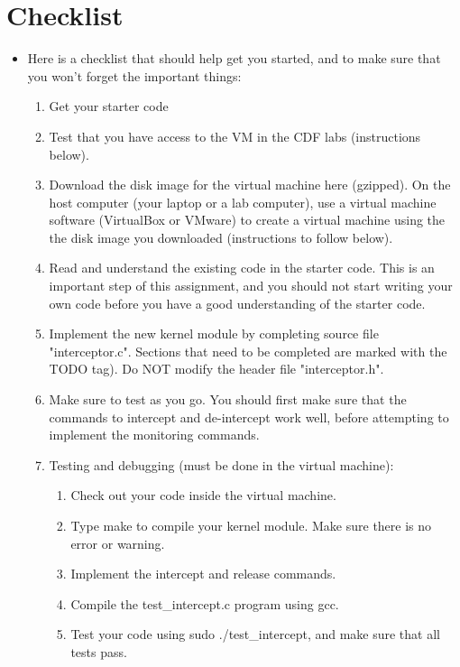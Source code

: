 \documentclass[12pt]{article}
\begin{document}
\section{Checklist}

\begin{itemize}
    \item

    Here is a checklist that should help get you started, and to make sure that you won't forget the important things:

    \begin{enumerate}[1.]
        \item Get your starter code
        \item Test that you have access to the VM in the CDF labs (instructions below).
        \item Download the disk image for the virtual machine here (gzipped).
              On the host computer (your laptop or a lab computer), use a virtual machine software (VirtualBox or VMware) to create a virtual machine using the the disk image you downloaded (instructions to follow below).
        \item Read and understand the existing code in the starter code. This is an important step of this assignment, and you should not start writing your own code before you have a good understanding of the starter code.
        \item Implement the new kernel module by completing source file "interceptor.c". Sections that need to be completed are marked with the TODO tag). Do NOT modify the header file "interceptor.h".
        \item Make sure to test as you go. You should first make sure that the commands to intercept and de-intercept work well, before attempting to implement the monitoring commands.
        \item Testing and debugging (must be done in the virtual machine):
        \begin{enumerate}
            \item Check out your code inside the virtual machine.
            \item Type make to compile your kernel module. Make sure there is no error or warning.
            \item Implement the intercept and release commands.
            \item Compile the test\_intercept.c program using gcc.
            \item Test your code using sudo ./test\_intercept, and make sure that all tests pass.

\end{enumerate}
\end{enumerate}
\end{itemize}
\end{document}
